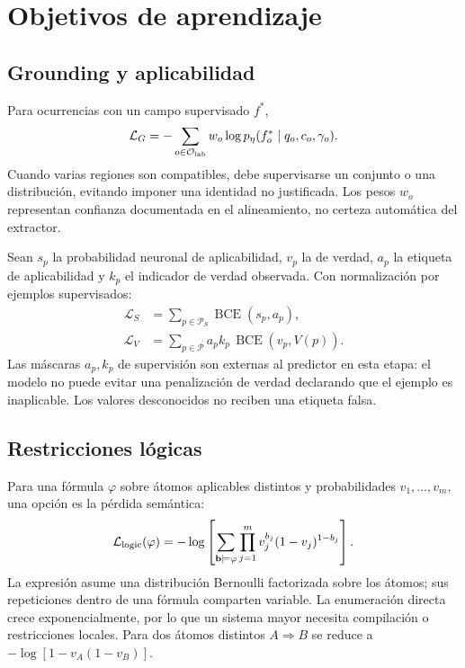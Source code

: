 \documentclass[11pt,a4paper]{article}
\newcommand{\loss}{\mathcal{L}}
\begin{document}
\section{Objetivos de aprendizaje}
\subsection{Grounding y aplicabilidad}
Para ocurrencias con un campo supervisado $f^*$,
\begin{equation}
 \loss_G=-\sum_{o\in\mathcal{O}_{\rm lab}} w_o
 \log p_\eta(f^*_o\mid q_o,c_o,\gamma_o).
\end{equation}
Cuando varias regiones son compatibles, debe supervisarse un conjunto o una
distribución, evitando imponer una identidad no justificada. Los pesos $w_o$
representan confianza documentada en el alineamiento, no certeza automática
del extractor.

Sean $s_p$ la probabilidad neuronal de aplicabilidad, $v_p$ la de verdad,
$a_p$ la etiqueta de aplicabilidad y $k_p$ el indicador de verdad observada.
Con normalización por ejemplos supervisados:
\begin{align}
 \loss_S&=\sum_{p\in\mathcal{P}_{S}}\operatorname{BCE}(s_p,a_p),\\
 \loss_V&=\sum_{p\in\mathcal{P}} a_p k_p\,
             \operatorname{BCE}(v_p,V(p)).
\end{align}
Las máscaras $a_p,k_p$ de supervisión son externas al predictor en esta etapa:
el modelo no puede evitar una penalización de verdad declarando que el ejemplo
es inaplicable. Los valores desconocidos no reciben una etiqueta falsa.

\subsection{Restricciones lógicas}
Para una fórmula $\varphi$ sobre átomos aplicables distintos y probabilidades
$v_1,\ldots,v_m$, una opción es la pérdida semántica\cite{semanticloss}:
\begin{equation}
 \loss_{\rm logic}(\varphi)=
 -\log\left[\sum_{\mathbf{b}\models\varphi}
       \prod_{j=1}^{m}v_j^{b_j}(1-v_j)^{1-b_j}\right].
\end{equation}
La expresión asume una distribución Bernoulli factorizada sobre los átomos;
sus repeticiones dentro de una fórmula comparten variable. La enumeración
directa crece exponencialmente, por lo que un sistema mayor necesita compilación
o restricciones locales. Para dos átomos distintos $A\Rightarrow B$ se reduce a
$-\log[1-v_A(1-v_B)]$.
\end{document}
